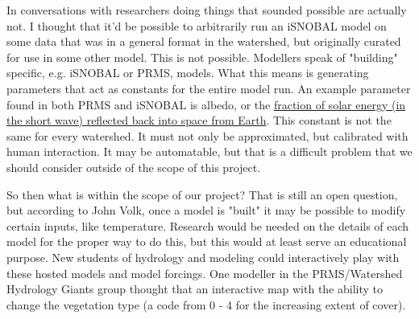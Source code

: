 \documentclass[
11pt, %
a4paper, %
oneside, %
twoside, %
headinclude,footinclude, %
BCOR5mm, %
]{scrartcl}
\begin{document}
In conversations with researchers doing things that sounded possible are actually not. 
I thought that it'd be possible to arbitrarily run an iSNOBAL model on some data that
was in a general format in the watershed, but originally curated for use in some other model.
This is not possible. Modellers speak of "building" specific, e.g. iSNOBAL or PRMS, models.
What this means is generating parameters that act as constants for the entire model run. 
An example parameter found in both PRMS and iSNOBAL is albedo, or the \href{https://www.esr.org/outreach/glossary/albedo.html}{fraction of solar energy (in the short wave) reflected back into space from Earth}. 
This constant is not the same for every watershed. It must not only be approximated,
but calibrated with human interaction. It may be automatable, but that is a difficult 
problem that we should consider outside of the scope of this project.

So then what is within the scope of our project? That is still an open question, but
according to John Volk, once a model is "built" it may be possible to modify certain 
inputs, like temperature. Research would be needed on the details of each model for
the proper way to do this, but this would at least serve an educational purpose. New students
of hydrology and modeling could interactively play with these hosted models and model 
forcings. One modeller in the PRMS/Watershed Hydrology Giants group thought that 
an interactive map with the ability to change the vegetation type (a code from 0 - 4 for the
increasing extent of cover). 

\end{document}
